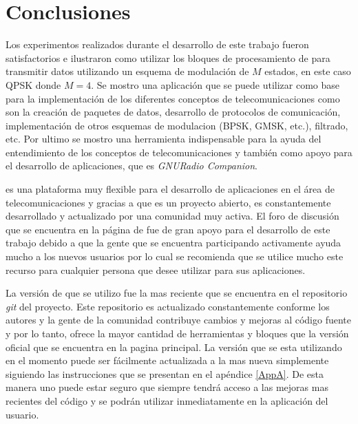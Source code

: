 \chapter{Conclusiones}
Los experimentos realizados durante el desarrollo de este trabajo fueron satisfactorios e ilustraron como utilizar los bloques de
procesamiento de \gnuradio para transmitir datos utilizando un esquema de modulaci\'on de $M$ estados, en este caso QPSK donde
$M=4$. Se mostro una aplicaci\'on que se puede utilizar como base para la implementaci\'on de los diferentes conceptos de
telecomunicaciones como son la creaci\'on de paquetes de datos, desarrollo de protocolos de comunicaci\'on, implementaci\'on de
otros esquemas de modulacion (BPSK, GMSK, etc.), filtrado, etc. Por ultimo se mostro una herramienta indispensable para la ayuda del
entendimiento de los conceptos de telecomunicaciones y tambi\'en como apoyo para el desarrollo de aplicaciones, que es
\emph{GNURadio Companion}.

\gnuradio es una plataforma muy flexible para el desarrollo de aplicaciones en el \'area de telecomunicaciones y gracias a que es
un proyecto abierto, es constantemente desarrollado y actualizado por una comunidad muy activa. El foro de discusi\'on que se
encuentra en la p\'agina de \gnuradio \cite{radio} fue de gran apoyo para el desarrollo de este trabajo debido a que la gente que
se encuentra participando activamente ayuda mucho a los nuevos usuarios por lo cual se recomienda que se utilice mucho este recurso para
cualquier persona que desee utilizar \gnuradio para sus aplicaciones.

La versi\'on de \gnuradio que se utilizo fue la mas reciente que se encuentra en el repositorio \emph{git} del proyecto. Este
repositorio es actualizado constantemente conforme los autores y la gente de la comunidad contribuye cambios y mejoras al c\'odigo
fuente y por lo tanto, ofrece la mayor cantidad de herramientas y bloques que la versi\'on oficial que se encuentra en la pagina
principal. La versi\'on que se esta utilizando en el momento puede ser f\'acilmente actualizada a la mas nueva simplemente
siguiendo las instrucciones que se presentan en el ap\'endice \ref{AppA}. De esta manera uno puede estar seguro que siempre
tendr\'a acceso a las mejoras mas recientes del c\'odigo y se podr\'an utilizar inmediatamente en la aplicaci\'on del usuario.

